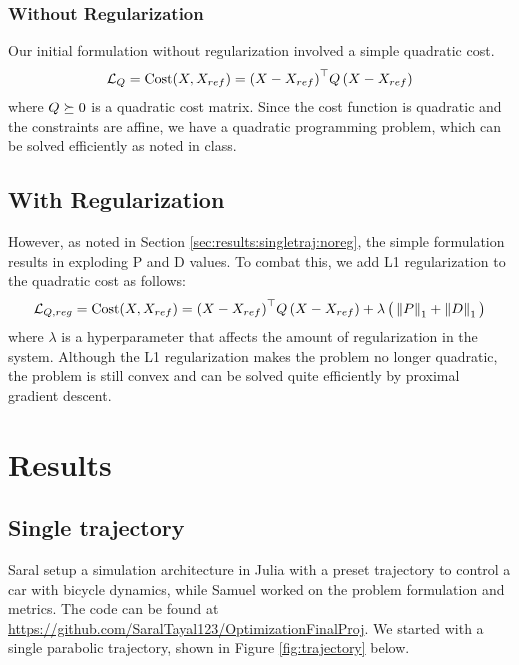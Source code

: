 \documentclass[11pt]{article}
\begin{document}
    \subsubsection{Without Regularization} \label{sec:prob:pdoptim:noreg}
    Our initial formulation without regularization involved a simple quadratic cost.
    \begin{align*}
        \mathcal{L}_Q = \mathrm{Cost}(X, X_{ref}) = {\left(X - X_{ref}\right)}^{\top} Q \left(X - X_{ref}\right)
    \end{align*}
    where $Q \succeq 0 $ is a quadratic cost matrix. Since the cost function is quadratic and the constraints are affine, we have a quadratic programming problem, which can be solved efficiently as noted in class.
    
    \subsection{With Regularization} \label{sec:prob:pdoptim:wreg}
    However, as noted in Section \ref{sec:results:singletraj:noreg}, the simple formulation results in exploding P and D values. To combat this, we add L1 regularization to the quadratic cost as follows:
    \begin{align*}
        \mathcal{L}_{Q,reg} = \mathrm{Cost}(X, X_{ref}) = {\left(X - X_{ref}\right)}^{\top} Q \left(X - X_{ref}\right) + \lambda \left(\strut \left\lVert P\right\rVert_1 + \left\lVert D\right\rVert_1 \strut \right)
    \end{align*}
    where $\lambda$ is a hyperparameter that affects the amount of regularization in the system. Although the L1 regularization makes the problem no longer quadratic, the problem is still convex and can be solved quite efficiently by proximal gradient descent.
    
    \section{Results} \label{sec:results}
    \subsection{Single trajectory} \label{sec:results:singletraj}
    Saral setup a simulation architecture in Julia with a preset trajectory to control a car with bicycle dynamics, while Samuel worked on the problem formulation and metrics. The code can be found at \href{https://github.com/SaralTayal123/OptimizationFinalProj}{https://github.com/SaralTayal123/OptimizationFinalProj}. We started with a single parabolic trajectory, shown in Figure \ref{fig:trajectory} below.
    
\end{document}
